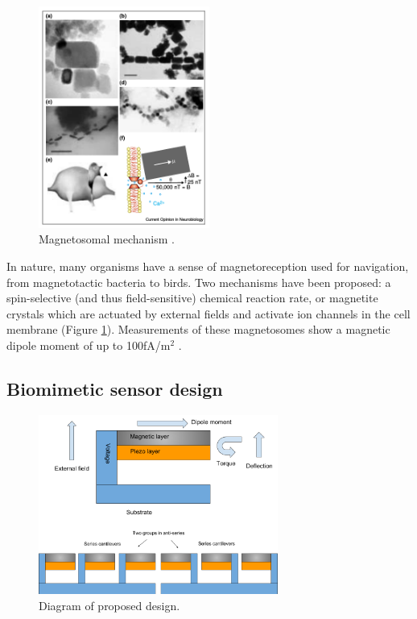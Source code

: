 \begin{figure}
\centering
\includegraphics[width=0.5\textwidth]{kirsh2001}
\caption{Magnetosomal mechanism \cite{kirschvink2001magnetite}.}
\label{fig:magnetosome}
\end{figure}

In nature, many organisms have a sense of magnetoreception used for navigation, from magnetotactic bacteria to birds. Two mechanisms have been proposed: a spin-selective (and thus field-sensitive) chemical reaction rate, or magnetite crystals which are actuated by external fields and activate ion channels in the cell membrane (Figure \ref{fig:magnetosome})\cite{johnsen2005physics,dodson2013radical,kirschvink2001magnetite}. Measurements of these magnetosomes show a magnetic dipole moment of up to 100fA/m$^2$ \cite{hanzlik2002pulsed,eder2012magnetic}.


\subsection{Biomimetic sensor design}

\begin{figure}
\centering
\includegraphics[width=0.7\textwidth]{biomag}
\caption{Diagram of proposed design.}
\label{fig:diagram}
\end{figure}

